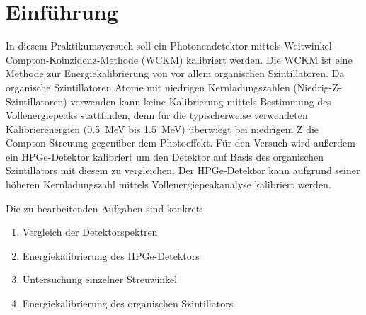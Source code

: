 \section{Einführung}
In diesem Praktikumsversuch soll ein Photonendetektor mittels Weitwinkel-Compton-Koinzidenz-Methode (WCKM) kalibriert werden.
Die WCKM ist eine Methode zur Energiekalibrierung von vor allem organischen Szintillatoren. Da organische Szintillatoren Atome mit niedrigen Kernladungszahlen (Niedrig-Z-Szintillatoren) verwenden kann keine Kalibrierung mittels Bestimmung des Vollenergiepeaks stattfinden, denn für die typischerweise verwendeten Kalibrierenergien (\SI{0.5}{\mega\electronvolt} bis \SI{1.5}{\mega\electronvolt}) überwiegt bei niedrigem Z die Compton-Streuung gegenüber dem Photoeffekt.
Für den Versuch wird außerdem ein HPGe-Detektor kalibriert um den Detektor auf Basis des organischen Szintillators mit diesem zu vergleichen. Der HPGe-Detektor kann aufgrund seiner höheren Kernladungszahl mittels Vollenergiepeakanalyse kalibriert werden.

Die zu bearbeitenden Aufgaben sind konkret:
\begin{enumerate}
    \item Vergleich der Detektorspektren
    \item Energiekalibrierung des HPGe-Detektors
    \item Untersuchung einzelner Streuwinkel
    \item Energiekalibrierung des organischen Szintillators
\end{enumerate}
